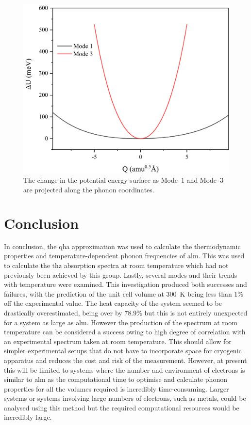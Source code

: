 \begin{figure}[t]
\centering
\includegraphics[scale=0.5]{Figures/Misc/QHA/ModeMapComparison.png}
\captionsetup{font = footnotesize, justification = centering}
\caption[The Change in the Potential Energy Surface as Mode~1 and Mode~3 are Projected along the Phonon Coordinates]{The change in the potential energy surface as Mode~1 and Mode~3 are projected along the phonon coordinates.}
\label{fig:modemap}
\end{figure}

\section{Conclusion}
In conclusion, the \acrshort{qha} approximation was used to calculate the thermodynamic properties and temperature\nobreakdash-dependent phonon frequencies of \acrshort{alm}. This was used to calculate the \acrshort{thz} absorption spectra at room temperature which had not previously been achieved by this group. Lastly, several modes and their trends with temperature were examined. This investigation produced both successes and failures, with the prediction of the unit cell volume at \SI{300}{K} being less than 1\% off the experimental value. The heat capacity of the system seemed to be drastically overestimated, being over by 78.9\% but this is not entirely unexpected for a system as large as \acrshort{alm}. However the production of the spectrum at room temperature can be considered a success owing to high degree of correlation with an experimental spectrum taken at room temperature. This should allow for simpler experimental setups that do not have to incorporate space for cryogenic apparatus and reduces the cost and risk of the measurement. However, at present this will be limited to systems where the number and environment of electrons is similar to \acrshort{alm} as the computational time to optimise and calculate phonon properties for all the volumes required is incredibly time\nobreakdash-consuming. Larger systems or systems involving large numbers of electrons, such as metals, could be analysed using this method but the required computational resources would be incredibly large. 
